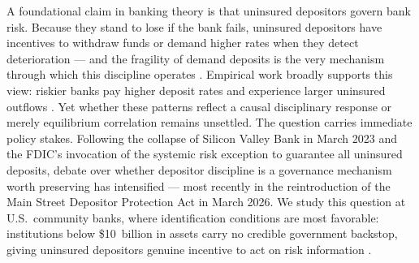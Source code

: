 
A foundational claim in banking theory is that uninsured depositors govern bank
risk. Because they stand to lose if the bank fails, uninsured depositors have
incentives to withdraw funds or demand higher rates when they detect deterioration
--- and the fragility of demand deposits is the very mechanism through which this
discipline operates \citep{calomiris1991role,diamond2001liquidity}. Empirical work
broadly supports this view: riskier banks pay higher deposit rates and experience
larger uninsured outflows
\citep{park1995market,martinez2001depositors,maechler2006dynamic,iyer2016tale,egan2017deposit}.
Yet whether these patterns reflect a causal disciplinary response or merely
equilibrium correlation remains unsettled. The question carries immediate policy
stakes. Following the collapse of Silicon Valley Bank in March 2023 and the
FDIC's invocation of the systemic risk exception to guarantee all uninsured
deposits, debate over whether depositor discipline is a governance mechanism
worth preserving has intensified --- most recently in the reintroduction of the
Main Street Depositor Protection Act in March 2026. We study this question at
U.S.\ community banks, where identification conditions are most favorable:
institutions below \$10~billion in assets carry no credible government backstop,
giving uninsured depositors genuine incentive to act on risk information
\citep{o1990deposit,flannery1996evidence}.

